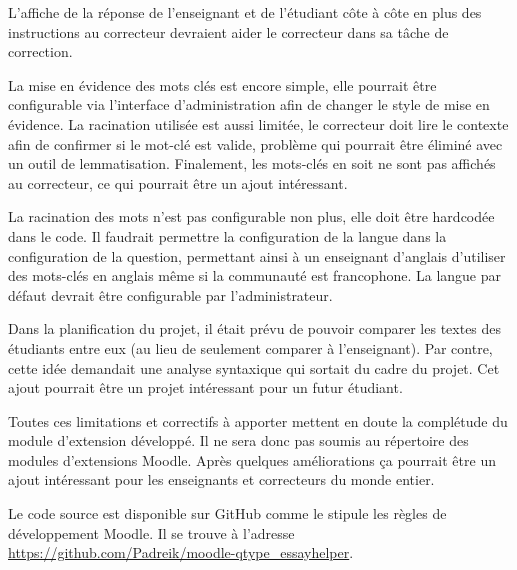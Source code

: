 \begin{conclusion}

L'affiche de la réponse de l'enseignant et de l'étudiant côte à côte en plus des instructions au correcteur devraient aider le correcteur dans sa tâche de correction.

La mise en évidence des mots clés est encore simple, elle pourrait être configurable via l'interface d'administration afin de changer le style de mise en évidence.
La racination utilisée est aussi limitée, le correcteur doit lire le contexte afin de confirmer si le mot-clé est valide, problème qui pourrait être éliminé avec un outil de lemmatisation.
Finalement, les mots-clés en soit ne sont pas affichés au correcteur, ce qui pourrait être un ajout intéressant.

La racination des mots n'est pas configurable non plus, elle doit être \og hardcodée \fg{} dans le code.
Il faudrait permettre la configuration de la langue dans la configuration de la question, permettant ainsi à un enseignant d'anglais d'utiliser des mots-clés en anglais même si la communauté est francophone.
La langue par défaut devrait être configurable par l'administrateur.

Dans la planification du projet, il était prévu de pouvoir comparer les textes des étudiants entre eux (au lieu de seulement comparer à l'enseignant).
Par contre, cette idée demandait une analyse syntaxique qui sortait du cadre du projet.
Cet ajout pourrait être un projet intéressant pour un futur étudiant.

Toutes ces limitations et correctifs à apporter mettent en doute la complétude du module d'extension développé.
Il ne sera donc pas soumis au répertoire des modules d'extensions Moodle.
Après quelques améliorations ça pourrait être un ajout intéressant pour les enseignants et correcteurs du monde entier.

Le code source est disponible sur GitHub comme le stipule les règles de développement Moodle.
Il se trouve à l'adresse \url{https://github.com/Padreik/moodle-qtype_essayhelper}.

\end{conclusion}